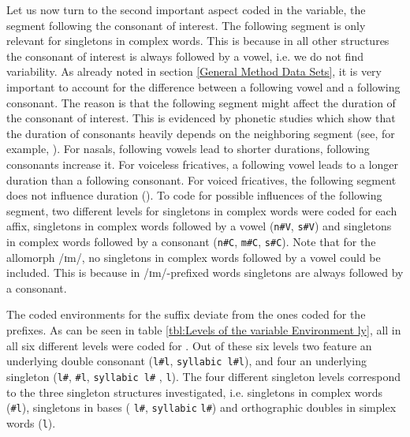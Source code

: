 Let us now turn to the second important aspect coded in the variable, the segment following the consonant of interest. The following segment is only relevant for singletons in complex words. This is because in all other structures the  consonant of interest is always followed by a vowel, i.e. we do not find variability.  
As already noted in section \ref{General Method Data Sets}, it is very important to account for the difference between a following vowel and a following consonant. The reason is that the following segment might affect the duration of the consonant of interest. This is evidenced by phonetic studies which show that the duration of consonants heavily depends on the neighboring segment (see, for example, \citealt{Umeda.1977}).  For nasals,  following vowels lead to shorter durations, following consonants increase it. For voiceless fricatives, a following vowel leads to a longer duration than a following consonant. For voiced fricatives, the following segment does not influence duration (\citealt[854]{Umeda.1977}). To code for possible influences of the following segment, two different levels for singletons in complex words were coded for each affix, singletons in complex words followed by a vowel (\texttt{n\#V}, \texttt{s\#V}) and singletons in complex words followed by a consonant (\texttt{n\#C}, \texttt{m\#C}, \texttt{s\#C}). Note that for the allomorph /ɪm/, no singletons in complex words followed by a vowel could be included. This is because in /ɪm/-prefixed words singletons are always followed by a consonant.


The coded environments for the suffix  deviate from the ones coded for the prefixes. 
As can be seen in table \ref{tbl:Levels of the variable Environment ly}, all in all six different levels were coded for . Out of these six levels two feature an underlying double consonant (\texttt{l\#l}, \texttt{syllabic l\#l}), and four an underlying singleton  (\texttt{l\#},  \texttt{\#l}, \texttt{syllabic l\#} , \texttt{l}). The four different singleton levels correspond to the three singleton structures investigated, i.e. singletons in complex words (\texttt{\#l}), singletons in bases ( \texttt{l\#}, \texttt{syllabic} \texttt{l\#}) and orthographic doubles in simplex words (\texttt{l}).

